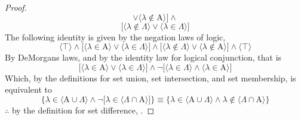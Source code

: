 \documentclass[preview]{standalone}
\begin{document}
\begin{proof}
\begin{equation*}
                \lor
            \Big \langle \lambda \notin \mathrm{A} \Big \rangle
        \bigg]
            \land
    \end{equation*}
    \begin{equation*}
        \bigg[
            \Big \langle \lambda \notin \Lambda \Big \rangle
                \lor 
            \Big \langle \lambda \in \Lambda \Big \rangle
        \bigg]
    \end{equation*}
    The following identity is given by the negation laws of logic,
    \begin{equation*}
        \big \langle \top \big \rangle
            \land
        \bigg[
            \Big \langle \lambda \in \mathrm{A} \Big \rangle
                \lor 
            \Big \langle \lambda \in \Lambda \Big \rangle
        \bigg]
            \land
        \bigg[
            \Big \langle \lambda \notin \Lambda \Big \rangle
                \lor
            \Big \langle \lambda \notin \mathrm{A} \Big \rangle
        \bigg]
            \land
        \big \langle \top \big \rangle
    \end{equation*}
    By DeMorgans laws,
    and by the identity law for logical conjunction, 
    that is
    \begin{equation*}
        \bigg[
            \Big \langle \lambda \in \mathrm{A} \Big \rangle
                \lor 
            \Big \langle \lambda \in \Lambda \Big \rangle
        \bigg]
            \land
        \lnot \bigg[
            \Big \langle \lambda \in \Lambda \Big \rangle
                \land
            \Big \langle \lambda \in \mathrm{A} \Big \rangle
        \bigg]
    \end{equation*}
    Which, by the definitions for set union, set intersection,
    and set membership, is equivalent to
    \begin{equation*}
        \Bigg\{
            \lambda \in \Big \langle \mathrm{A} \cup \Lambda \Big \rangle
                \land
            \lnot \bigg[ 
                \lambda \in \Big \langle \Lambda \cap \mathrm{A} \Big \rangle
            \bigg]
        \Bigg\}
            \equiv
        \Bigg\{
            \lambda \in \Big \langle \mathrm{A} \cup \Lambda \Big \rangle
                \land
            \lambda \notin \Big \langle \Lambda \cap \mathrm{A} \Big \rangle
        \Bigg\}
    \end{equation*}
    $\therefore$ by the definition for set difference,
    .
\color{lightgray} \end{proof}
\end{document}

